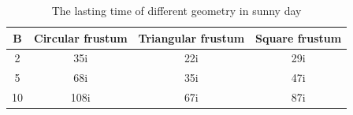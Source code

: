 \documentclass{mcmthesis}		    %
\begin{document}
            \begin{table}[htbp!]
            	\centering
            	\caption{The lasting time of different geometry in sunny day}
            	\label{tab:The lasting time of different geometry in sunny day}
            	\begin{tabular}{|c|c|c|c|}
            		\hline
            		B &Circular frustum  & Triangular frustum   & Square frustum   \\ \hline
            		2 & 35i & 22i & 29i \\ \hline
            		5 & 68i & 35i & 47i \\ \hline
            		10 & 108i & 67i & 87i \\ \hline
            	\end{tabular}
            \end{table}
            
\end{document}
